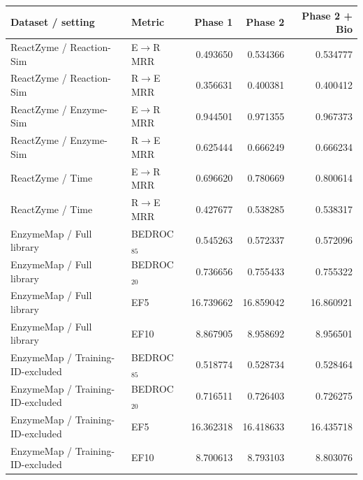 \begingroup\setlength{\tabcolsep}{2.8pt}
\begin{tabular}{@{}llrrr@{}}
\toprule
Dataset / setting & Metric & Phase 1 & Phase 2 & Phase 2 + Bio \\
\midrule
ReactZyme / Reaction-Sim & E$\to$R MRR & 0.493650 & 0.534366 & 0.534777 \\
ReactZyme / Reaction-Sim & R$\to$E MRR & 0.356631 & 0.400381 & 0.400412 \\
ReactZyme / Enzyme-Sim & E$\to$R MRR & 0.944501 & 0.971355 & 0.967373 \\
ReactZyme / Enzyme-Sim & R$\to$E MRR & 0.625444 & 0.666249 & 0.666234 \\
ReactZyme / Time & E$\to$R MRR & 0.696620 & 0.780669 & 0.800614 \\
ReactZyme / Time & R$\to$E MRR & 0.427677 & 0.538285 & 0.538317 \\
EnzymeMap / Full library & BEDROC$_{85}$ & 0.545263 & 0.572337 & 0.572096 \\
EnzymeMap / Full library & BEDROC$_{20}$ & 0.736656 & 0.755433 & 0.755322 \\
EnzymeMap / Full library & EF5 & 16.739662 & 16.859042 & 16.860921 \\
EnzymeMap / Full library & EF10 & 8.867905 & 8.958692 & 8.956501 \\
EnzymeMap / Training-ID-excluded & BEDROC$_{85}$ & 0.518774 & 0.528734 & 0.528464 \\
EnzymeMap / Training-ID-excluded & BEDROC$_{20}$ & 0.716511 & 0.726403 & 0.726275 \\
EnzymeMap / Training-ID-excluded & EF5 & 16.362318 & 16.418633 & 16.435718 \\
EnzymeMap / Training-ID-excluded & EF10 & 8.700613 & 8.793103 & 8.803076 \\
\bottomrule
\end{tabular}
\endgroup
